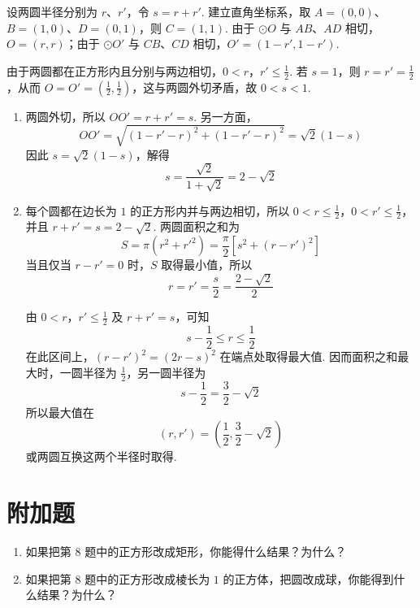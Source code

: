 \begin{solution}
设两圆半径分别为 \(r\)、\(r'\)，令 \(s=r+r'\). 建立直角坐标系，取 \(A=(0,0)\)、\(B=(1,0)\)、\(D=(0,1)\)，则 \(C=(1,1)\). 由于 \(\odot O\) 与 \(AB\)、\(AD\) 相切，\(O=(r,r)\)；由于 \(\odot O'\) 与 \(CB\)、\(CD\) 相切，\(O'=(1-r',1-r')\).


由于两圆都在正方形内且分别与两边相切，\(0<r\)，\(r'\le\frac12\). 若 \(s=1\)，则 \(r=r'=\frac12\)，从而 \(O=O'=\left(\frac12,\frac12\right)\)，这与两圆外切矛盾，故 \(0<s<1\).

\begin{enumerate}
\item 两圆外切，所以 \(OO'=r+r'=s\). 另一方面，
\[
OO'=\sqrt{\left( 1-r'-r \right)^2+\left( 1-r'-r \right)^2}=\sqrt2\left( 1-s \right)
\]
因此 \(s=\sqrt2\left( 1-s \right)\)，解得
\[
s=\frac{\sqrt2}{1+\sqrt2}=2-\sqrt2
\]

\item 每个圆都在边长为 \(1\) 的正方形内并与两边相切，所以 \(0<r\le\frac12\)，\(0<r'\le\frac12\)，并且 \(r+r'=s=2-\sqrt2\).
两圆面积之和为
\[
S=\pi\left( r^2+r'^2 \right)=\frac{\pi}{2}\left[ s^2+\left( r-r' \right)^2 \right]
\]
当且仅当 \(r-r'=0\) 时，\(S\) 取得最小值，所以
\[
r=r'=\frac{s}{2}=\frac{2-\sqrt2}{2}
\]

由 \(0<r\)，\(r'\le\frac12\) 及 \(r+r'=s\)，可知
\[
s-\frac12\le r\le\frac12
\]
在此区间上，\(\left( r-r' \right)^2=\left( 2r-s \right)^2\) 在端点处取得最大值. 因而面积之和最大时，一圆半径为 \(\frac12\)，另一圆半径为
\[
s-\frac12=\frac32-\sqrt2
\]
所以最大值在
\[
\left( r,r' \right)=\left( \frac12,\frac32-\sqrt2 \right)
\]
或两圆互换这两个半径时取得.
\end{enumerate}
\end{solution}

\section{附加题}

\begin{problem}
\begin{enumerate}
\item 如果把第 \(8\) 题中的正方形改成矩形，你能得什么结果？为什么？

\item 如果把第 \(8\) 题中的正方形改成棱长为 \(1\) 的正方体，把圆改成球，你能得到什么结果？为什么？
\end{enumerate}
\end{problem}

